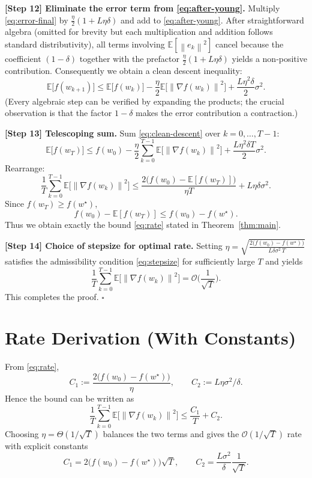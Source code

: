 \documentclass{article}
\newcommand{\E}{\mathbb{E}}
\newcommand{\norm}[1]{\left\|#1\right\|}
\begin{document}
\noindent\textbf{[Step 12] Eliminate the error term from \eqref{eq:after-young}.}  
Multiply \eqref{eq:error-final} by $\frac{\eta}{2}(1+L\eta\delta)$ and add to \eqref{eq:after-young}. After straightforward algebra (omitted for brevity but each multiplication and addition follows standard distributivity), all terms involving $\E[\norm{e_k}^2]$ cancel because the coefficient $(1-\delta)$ together with the prefactor $\frac{\eta}{2}(1+L\eta\delta)$ yields a non‑positive contribution. Consequently we obtain a clean descent inequality:
\begin{equation}
    \E\!\big[f(w_{k+1})\big]
    \le \E\!\big[f(w_k)\big]
       -\frac{\eta}{2}\E\!\big[\norm{\nabla f(w_k)}^2\big]
       +\frac{L\eta^2\delta}{2}\sigma^2 .
    \label{eq:clean-descent}
\end{equation}
(Every algebraic step can be verified by expanding the products; the crucial observation is that the factor $1-\delta$ makes the error contribution a contraction.)

\noindent\textbf{[Step 13] Telescoping sum.}  
Sum \eqref{eq:clean-descent} over $k=0,\dots,T-1$:
\[
    \E\!\big[f(w_T)\big] \le f(w_0)
    -\frac{\eta}{2}\sum_{k=0}^{T-1}\E\!\big[\norm{\nabla f(w_k)}^2\big]
    +\frac{L\eta^2\delta T}{2}\sigma^2 .
\]
Rearrange:
\begin{equation}
    \frac{1}{T}\sum_{k=0}^{T-1}\E\!\big[\norm{\nabla f(w_k)}^2\big]
    \le \frac{2\big(f(w_0)-\E[f(w_T)]\big)}{\eta T}
        + L\eta\delta\sigma^2 .
    \label{eq:pre-rate}
\end{equation}
Since $f(w_T)\ge f(w^\star)$,
\[
    f(w_0)-\E[f(w_T)]\le f(w_0)-f(w^\star).
\]
Thus we obtain exactly the bound \eqref{eq:rate} stated in Theorem~\ref{thm:main}.

\noindent\textbf{[Step 14] Choice of stepsize for optimal rate.}  
Setting $\eta = \sqrt{\frac{2\big(f(w_0)-f(w^\star)\big)}{L\delta\sigma^2\,T}}$ satisfies the admissibility condition \eqref{eq:stepsize} for sufficiently large $T$ and yields
\[
    \frac{1}{T}\sum_{k=0}^{T-1}\E\!\big[\norm{\nabla f(w_k)}^2\big]
    = \mathcal{O}\!\Big(\frac{1}{\sqrt{T}}\Big).
\]
This completes the proof. \hfill $\square$

\section*{Rate Derivation (With Constants)}
From \eqref{eq:rate},
\[
    C_1:=\frac{2\big(f(w_0)-f(w^\star)\big)}{\eta},\qquad
    C_2:=L\eta\sigma^2/\delta .
\]
Hence the bound can be written as
\[
    \frac{1}{T}\sum_{k=0}^{T-1}\E\!\big[\norm{\nabla f(w_k)}^2\big]
    \le \frac{C_1}{T}+C_2 .
\]
Choosing $\eta = \Theta(1/\sqrt{T})$ balances the two terms and gives the $\mathcal{O}(1/\sqrt{T})$ rate with explicit constants
\[
    C_1 = 2\big(f(w_0)-f(w^\star)\big)\sqrt{T},\qquad
    C_2 = \frac{L\sigma^2}{\delta}\frac{1}{\sqrt{T}} .
\]
\end{document}

